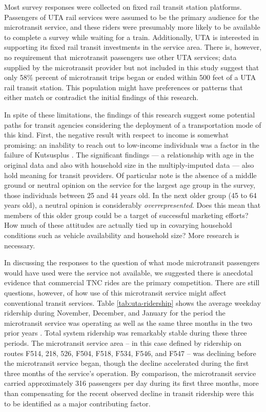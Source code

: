 \documentclass[smartcities,article,submit,moreauthors,pdftex]{Definitions/mdpi}
\begin{document}
Most survey responses were collected on fixed rail transit station platforms. Passengers of UTA rail services were assumed to be the primary audience for the microtransit service, and these riders were presumably more likely to be available to complete a survey while waiting for a train. Additionally, UTA is interested in supporting its fixed rail transit investments in the service area. There is, however, no requirement that microtransit passengers use other UTA services; data supplied by the microtransit provider but not included in this study suggest that only 58\% percent of microtransit trips began or ended within 500 feet of a UTA rail transit station. This population might have preferences or patterns that either match or contradict the initial findings of this research.

In spite of these limitations, the findings of this research suggest some potential paths for transit agencies considering the deployment of a transportation mode of this kind. First, the negative result with respect to income is somewhat promising: an inability to reach out to low-income individuals was a factor in the failure of Kutsusplus \citep{weckstrom2018}. The significant findings --- a relationship with age in the original data and also with household size in the multiply-imputed data --- also hold meaning for transit providers. Of particular note is the absence of a middle ground or neutral opinion on the service for the largest age group in the survey, those individuals between 25 and 44 years old. In the next older group (45 to 64 years old), a neutral opinion is considerably \emph{overrepresented}. Does this mean that members of this older group could be a target of successful marketing efforts? How much of these attitudes are actually tied up in covarying household conditions such as vehicle availability and household size? More research is necessary.

In discussing the responses to the question of what mode microtransit passengers would have used were the service not available, we suggested there is anecdotal evidence that commercial TNC rides are the primary competition. There are still questions, however, of how use of this microtransit service might affect conventional transit services. Table \ref{tab:uta-ridership} shows the average weekday ridership during November, December, and January for the period the microtransit service was operating as well as the same three months in the two prior years \citep{uta2020boardings}. Total system ridership was remarkably stable during these three periods. The microtransit service area -- in this case defined by ridership on routes F514, 218, 526, F504, F518, F534, F546, and F547 -- was declining before the microtransit service began, though the decline accelerated during the first three months of the service’s operation. By comparison, the microtransit service carried approximately 316 passengers per day during its first three months, more than compensating for the recent observed decline in transit ridership were this to be identified as a major contributing factor.
\end{document}
